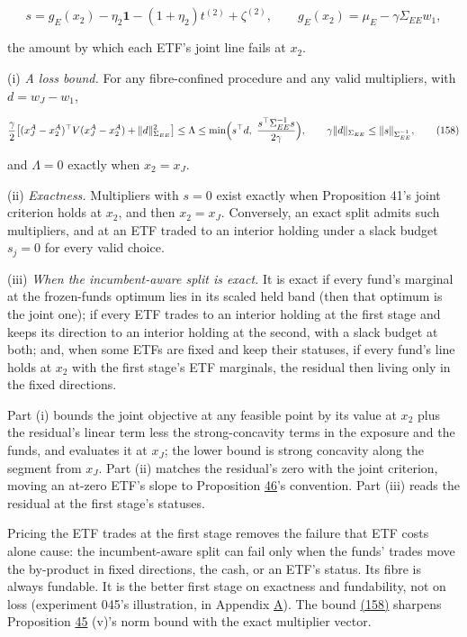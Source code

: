 \documentclass[11pt]{article}
\begin{document}
\begin{equation*}
s=g_E(x_2)-\eta_2\mathbf1-(1+\eta_2)t^{(2)}+\zeta^{(2)},\qquad g_E(x_2)=\mu_E-\gamma\Sigma_{EE}w_1,\tag{157}\label{eq:157}
\end{equation*}

the amount by which each ETF's joint line fails at \(x_2\).

(i) \emph{A loss bound.} For any fibre-confined procedure and any valid
multipliers, with \(d=w_J-w_1\),

\begin{equation*}
\frac\gamma2\bigl[(x^A_J-x^A_2)^\top V(x^A_J-x^A_2)+\|d\|^2_{\Sigma_{EE}}\bigr]\leq\Lambda\leq\min\Bigl(s^\top d,\ \frac{s^\top\Sigma_{EE}^{-1}s}{2\gamma}\Bigr),\qquad
\gamma\|d\|_{\Sigma_{EE}}\leq\|s\|_{\Sigma_{EE}^{-1}},\tag{158}\label{eq:158}
\end{equation*}

and \(\Lambda=0\) exactly when \(x_2=x_J\).

(ii) \emph{Exactness.} Multipliers with \(s=0\) exist exactly when Proposition
41's joint criterion holds at \(x_2\), and then \(x_2=x_J\). Conversely, an exact
split admits such multipliers, and at an ETF traded to an interior
holding under a slack budget \(s_j=0\) for every valid choice.

(iii) \emph{When the incumbent-aware split is exact.} It is exact if every
fund's marginal at the frozen-funds optimum lies in its scaled held
band (then that optimum is the joint one); if every ETF trades to an
interior holding at the first stage and keeps its direction to an
interior holding at the second, with a slack budget at both; and, when
some ETFs are fixed and keep their statuses, if every fund's line holds
at \(x_2\) with the first stage's ETF marginals, the residual then living
only in the fixed directions.

Part (i) bounds the joint objective at any feasible point by its value
at \(x_2\) plus the residual's linear term less the strong-concavity
terms in the exposure and the funds, and evaluates it at \(x_J\); the lower
bound is strong concavity along the segment from \(x_J\). Part (ii) matches
the residual's zero with the joint criterion, moving an at-zero ETF's
slope to Proposition \hyperref[res:Proposition-46]{46}'s convention. Part (iii) reads the residual at
the first stage's statuses.

Pricing the ETF trades at the first stage removes the failure that ETF
costs alone cause: the incumbent-aware split can fail only when the
funds' trades move the by-product in fixed directions, the cash, or an
ETF's status. Its fibre is always fundable. It is the better first
stage on exactness and fundability, not on loss (experiment 045's
illustration, in Appendix \hyperref[sec:A]{A}). The bound \hyperref[eq:158]{(158)} sharpens Proposition \hyperref[res:Proposition-45]{45}
(v)'s norm bound with the exact multiplier vector.
\end{document}
